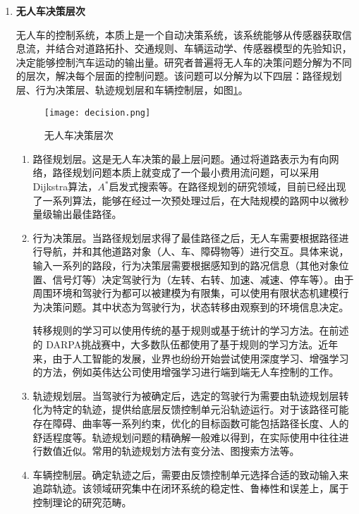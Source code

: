 \begin{enumerate}[wide=\parindent]
\item \textbf{无人车决策层次}
\label{sec:hierarchy}

无人车的控制系统，本质上是一个自动决策系统，该系统能够从传感器获取信息流，并结合对道路拓扑、交通规则、车辆运动学、传感器模型的先验知识，决定能够控制汽车运动的输出量。研究者普遍将无人车的决策问题分解为不同的层次，解决每个层面的控制问题。该问题可以分解为以下四层：路径规划层、行为决策层、轨迹规划层和车辆控制层\cite{paden2016survey}，如图\ref{fig:decision0}。

\begin{figure}[htbp]
\centering
\texttt{[image: decision.png]}
\caption{无人车决策层次\cite{paden2016survey}}
\label{fig:decision0}
\end{figure}
\begin{enumerate}[label=(\arabic*), wide=\parindent]
\item 路径规划层。这是无人车决策的最上层问题。通过将道路表示为有向网络，路径规划问题本质上就变成了一个最小费用流问题，可以采用 Dijkstra算法\cite{Dijkstra1959A}，$A^*$启发式搜索\cite{Nilsson1969A}等。在路径规划的研究领域，目前已经出现了一系列算法，能够在经过一次预处理过后，在大陆规模的路网中以微秒量级输出最佳路径\cite{Goldberg2003Computing,Geisberger2012Exact}。

\item 行为决策层。当路径规划层求得了最佳路径之后，无人车需要根据路径进行导航，并和其他道路对象（人、车、障碍物等）进行交互。具体来说，输入一系列的路段，行为决策层需要根据感知到的路况信息（其他对象位置、信号灯等）决定驾驶行为（左转、右转、加速、减速、停车等）。由于周围环境和驾驶行为都可以被建模为有限集，可以使用有限状态机建模行为决策问题。其中状态为驾驶行为，状态转移由观察到的环境信息决定。

转移规则的学习可以使用传统的基于规则或基于统计的学习方法。在前述的 DARPA挑战赛中，大多数队伍都使用了基于规则的学习方法\cite{Buehler2009The}。近年来，由于人工智能的发展，业界也纷纷开始尝试使用深度学习、增强学习的方法，例如英伟达公司使用增强学习进行端到端无人车控制的工作\cite{Bojarski2016End}。

\item 轨迹规划层。当驾驶行为被确定后，选定的驾驶行为需要由轨迹规划层转化为特定的轨迹，提供给底层反馈控制单元沿轨迹运行。对于该路径可能存在障碍、曲率等一系列约束，优化的目标函数可能包括路径长度、人的舒适程度等。轨迹规划问题的精确解一般难以得到，在实际使用中往往进行数值近似。常用的轨迹规划方法有变分法、图搜索方法等。

\item 车辆控制层。确定轨迹之后，需要由反馈控制单元选择合适的致动输入来追踪轨迹。该领域研究集中在闭环系统的稳定性、鲁棒性和误差上，属于控制理论的研究范畴。


\end{enumerate}
\end{enumerate}

